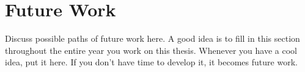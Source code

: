 \section{Future Work}
Discuss possible paths of future work here. A good idea is to fill in this section throughout the entire year you work on this thesis. Whenever you have a cool idea, put it here. If you don’t have time to develop it, it becomes future work.

